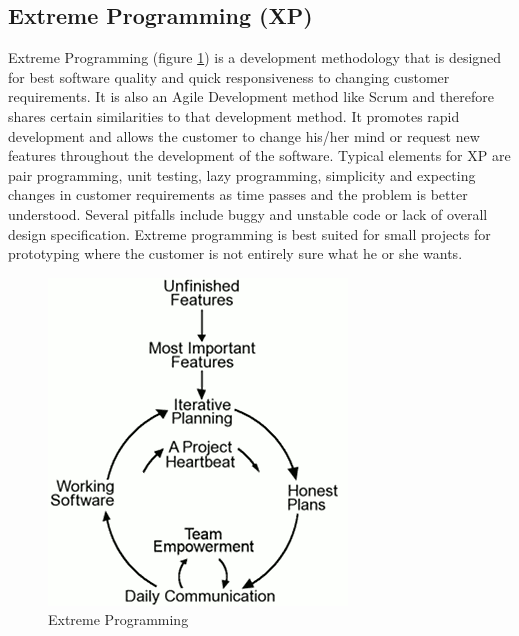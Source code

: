 \subsection{Extreme Programming (XP)}
Extreme Programming (figure \ref{fig:designmodel-xp}) is a development methodology that is designed for
best software quality and quick responsiveness to changing customer requirements. It is also an Agile Development
method like Scrum and therefore shares certain similarities to that development method. It promotes rapid
development and allows the customer to change his/her mind or request new features throughout
the development of the software. Typical elements for XP are pair programming, unit testing,
lazy programming, simplicity and expecting changes in customer requirements as time passes
and the problem is better understood. Several pitfalls include buggy and unstable code or lack of
overall design specification. Extreme programming is best suited for small projects for prototyping
where the customer is not entirely sure what he or she wants.
\begin{figure}[h!]
\centering \includegraphics[scale=0.75]{img/designmodel-xp}
\caption{Extreme Programming~\cite{link:xp}\cite{link:wiki-xp}}
\label{fig:designmodel-xp}
\end{figure}

